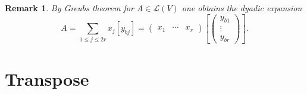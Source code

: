 \documentclass[aps,preprint]{revtex4}
\newtheorem{remark}[theorem]{Remark}
\begin{document}
\begin{remark}
By Greubs theorem for $A\in \mathcal{L}\left( V\right) $ one obtains the
dyadic expansion 
\begin{equation}
A=\sum_{1\leq j\leq 2r}x_{j}\left[ y_{bj}\right] =\left( 
\begin{array}{ccc}
x_{1} & \cdots & x_{r}%
\end{array}%
\right) \left[ \left( 
\begin{array}{c}
y_{b1} \\ 
\vdots \\ 
y_{br}%
\end{array}%
\right) \right] .
\end{equation}
\end{remark}

\section{Transpose}
\end{document}
